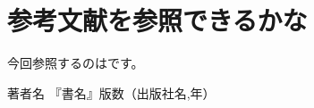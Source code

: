 \documentclass{jsarticle}
\begin{document}
\section{参考文献を参照できるかな}

今回参照するのは\cite{marker}です。

\begin{thebibliography}{99}
 著者名 『書名』版数（出版社名,年）
\end{thebibliography}
\end{document}

